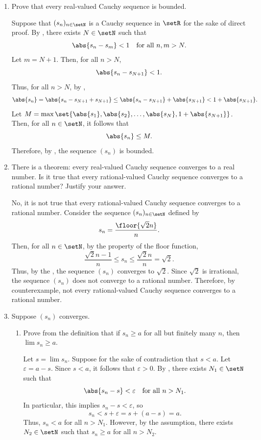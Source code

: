 \begin{enumerate}
  \newpage
  \item Prove that every real-valued Cauchy sequence is bounded.
  \begin{subprove}
    Suppose that \((s_n)_{n\in\setN}\) is a Cauchy sequence in \(\setR\) for the sake of direct proof.
    By , there exists \(N \in \setN\) such that
    \[
      \abs{s_n - s_m} < 1 \quad\text{for all } n, m > N.
    \]
    Let \(m = N+1\). Then, for all \(n > N\),
    \[
      \abs{s_n - s_{N+1}} < 1.
    \]
    Thus, for all \(n > N\), by ,
    \[
      \abs{s_n} = \abs{s_n - s_{N+1} + s_{N+1}} \leq \abs{s_n - s_{N+1}} + \abs{s_{N+1}} < 1 + \abs{s_{N+1}}.
    \]
    Let \(M = \max\set{ \abs{s_1}, \abs{s_2}, \ldots, \abs{s_N}, 1 + \abs{s_{N+1}} }\). Then, for all \(n \in \setN\), it follows that
    \[
      \abs{s_n} \leq M.
    \]
    Therefore, by , the sequence \((s_n)\) is bounded.
  \end{subprove}

  \item There is a theorem: every real-valued Cauchy sequence converges to a real number. 
  Is it true that every rational-valued Cauchy sequence converges to a rational number? Justify your answer.
  \begin{subanswer}
    No, it is not true that every rational-valued Cauchy sequence converges to a rational number.
    Consider the sequence \((s_n)_{n\in\setN}\) defined by
    \[
      s_n = \frac{\floor{\sqrt{2}n}}{n}.
    \]
    Then, for all \(n\in \setN\), by the property of the floor function,
    \[
      \dfrac{\sqrt{2}n - 1}{n} \le s_n \le \dfrac{\sqrt{2}n}{n} = \sqrt{2}.
    \]
    Thus, by the , the sequence \((s_n)\) converges to \(\sqrt{2}\).
    Since \(\sqrt{2}\) is irrational, the sequence \((s_n)\) does not converge to a rational number.
    Therefore, by counterexample, not every rational-valued Cauchy sequence converges to a rational number.
  \end{subanswer}



  \newpage
  \item Suppose \((s_n)\) converges.
    \begin{enumerate}
      \item Prove from the definition that if \(s_n\ge a\) 
      for all but finitely many \(n\), then \(\lim s_n\ge a\).
      \begin{subprove}
        Let \(s = \lim s_n\). Suppose for the sake of contradiction that \(s < a\).
        Let \(\varepsilon = a - s\). Since \(s < a\), it follows that \(\varepsilon > 0\).
        By , there exists \(N_1 \in \setN\) such that
        \[
          \abs{s_n - s} < \varepsilon \quad\text{for all } n > N_1.
        \]
        In particular, this implies \(s_n - s < \varepsilon\), so
        \[
          s_n < s + \varepsilon = s + (a - s) = a.
        \]
        Thus, \(s_n < a\) for all \(n > N_1\).
        However, by the assumption,
        there exists \(N_2 \in \setN\) such that \(s_n \ge a\) for all \(n > N_2\).
        

\end{subprove}
\end{enumerate}
\end{enumerate}
